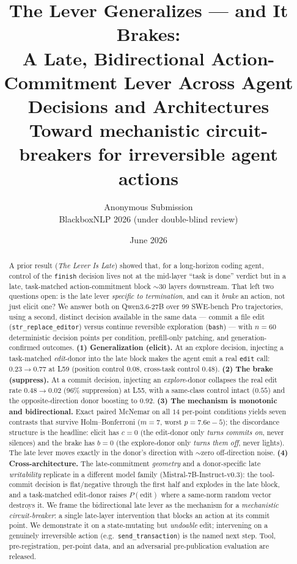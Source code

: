 \documentclass[11pt]{article}
\title{The Lever Generalizes --- and It Brakes: \\
A Late, Bidirectional Action-Commitment Lever Across Agent Decisions and Architectures \\[2pt]
\large Toward mechanistic circuit-breakers for irreversible agent actions}
\author{Anonymous Submission \\ BlackboxNLP 2026 (under double-blind review)}
\date{June 2026}
\begin{document}
\maketitle

\begin{abstract}
A prior result (\emph{The Lever Is Late}) showed that, for a long-horizon coding agent, control of the
\texttt{finish} decision lives not at the mid-layer ``task is done'' verdict but in a late, task-matched
action-commitment block $\sim$30 layers downstream. That left two questions open: is the late lever
\emph{specific to termination}, and can it \emph{brake} an action, not just elicit one? We answer both on
Qwen3.6-27B over 99 SWE-bench Pro trajectories, using a second, distinct decision available in the same data
--- commit a file edit (\texttt{str\_replace\_editor}) versus continue reversible exploration (\texttt{bash})
--- with $n{=}60$ deterministic decision points per condition, prefill-only patching, and generation-confirmed
outcomes. \textbf{(1) Generalization (elicit).} At an explore decision, injecting a task-matched
\emph{edit}-donor into the late block makes the agent emit a real \texttt{edit} call: $0.23 \to 0.77$ at L59
(position control $0.08$, cross-task control $0.48$). \textbf{(2) The brake (suppress).} At a commit decision,
injecting an \emph{explore}-donor collapses the real edit rate $0.48 \to 0.02$ (96\% suppression) at L55, with
a same-class control intact ($0.55$) and the opposite-direction donor boosting to $0.92$. \textbf{(3) The
mechanism is monotonic and bidirectional.} Exact paired McNemar on all $14$ per-point conditions yields seven
contrasts that survive Holm--Bonferroni ($m{=}7$, worst $p{=}7.6\mathrm{e}{-}5$); the discordance structure is
the headline: elicit has $c{=}0$ (the edit-donor only \emph{turns commits on}, never silences) and the brake
has $b{=}0$ (the explore-donor only \emph{turns them off}, never lights). The late lever moves exactly in the
donor's direction with $\sim$zero off-direction noise. \textbf{(4) Cross-architecture.} The late-commitment
\emph{geometry} and a donor-specific late \emph{writability} replicate in a different model family
(Mistral-7B-Instruct-v0.3): the tool-commit decision is flat/negative through the first half and explodes in
the late block, and a task-matched edit-donor raises $P(\text{edit})$ where a same-norm random vector destroys
it. We frame the bidirectional late lever as the mechanism for a \emph{mechanistic circuit-breaker}: a single
late-layer intervention that blocks an action at its commit point. We demonstrate it on a state-mutating but
\emph{undoable} edit; intervening on a genuinely irreversible action (e.g.\ \texttt{send\_transaction}) is the
named next step. Tool, pre-registration, per-point data, and an adversarial pre-publication evaluation are
released.
\end{abstract}
\end{document}
